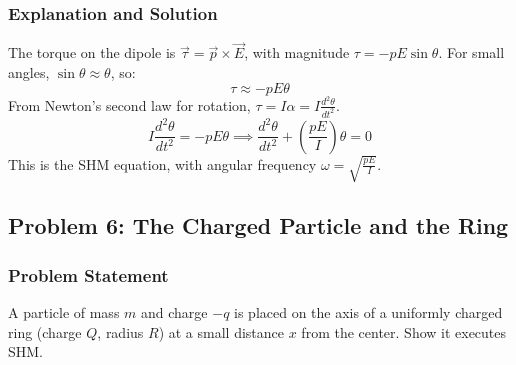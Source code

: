 \documentclass{article}
\begin{document}
\subsubsection*{Explanation and Solution}
The torque on the dipole is $\vec{\tau} = \vec{p} \times \vec{E}$, with magnitude $\tau = -pE\sin\theta$. For small angles, $\sin\theta \approx \theta$, so:
$$ \tau \approx -pE\theta $$
From Newton's second law for rotation, $\tau = I\alpha = I\frac{d^2\theta}{dt^2}$.
$$ I\frac{d^2\theta}{dt^2} = -pE\theta \implies \frac{d^2\theta}{dt^2} + \left(\frac{pE}{I}\right)\theta = 0 $$
This is the SHM equation, with angular frequency $\omega = \sqrt{\frac{pE}{I}}$.

\hrulefill

\subsection{Problem 6: The Charged Particle and the Ring}
\subsubsection*{Problem Statement}
A particle of mass $m$ and charge $-q$ is placed on the axis of a uniformly charged ring (charge $Q$, radius $R$) at a small distance $x$ from the center. Show it executes SHM.

\begin{center}
\end{center}
\end{document}
